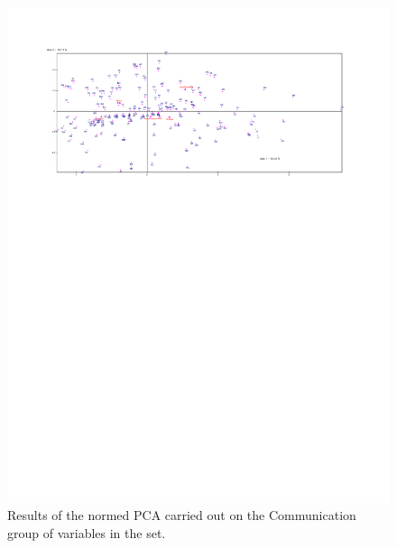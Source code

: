 \documentclass[a4paper,10pt,twocolumn]{article}
\begin{document}
\begin{figure}[!ht]
\begin{center}
\includegraphics[width=17cm]{p4b.pdf}
\caption{\footnotesize{Results of the normed PCA carried out on the Communication group of variables in the set.}\label{p4}}
\end{center}
\end{figure}
\end{document}

